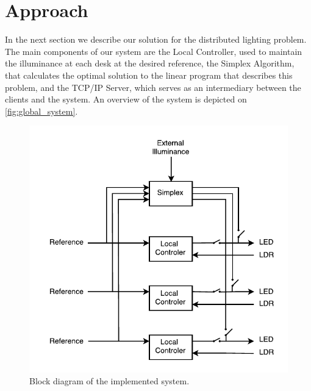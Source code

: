 \section{Approach}

In the next section we describe our solution for the distributed lighting problem. The main components of our system are the Local Controller, used to maintain the illuminance at each desk at the desired reference, the Simplex Algorithm, that calculates the optimal solution to the linear program that describes this problem, and the TCP/IP Server, which serves as an intermediary between the clients and the system. An overview of the system is depicted on \autoref{fig:global_system}.

\begin{figure}[!ht]
    \centering
        \includegraphics[scale=0.8]{img/GlobalSystem}
    \caption{Block diagram of the implemented system.}\label{fig:global_system}
\end{figure}







